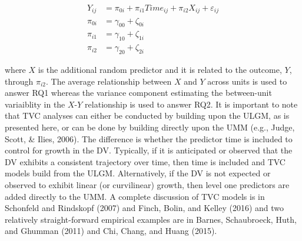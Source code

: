 \documentclass[english,,man]{apa6}
\theoremstyle{definition}
\theoremstyle{definition}
\theoremstyle{definition}
\theoremstyle{remark}
\begin{document}
\begin{align}
\label{ULGM}
Y_{ij} &= \pi_{0i} + \pi_{i1}Time_{ij} + \pi_{i2}X_{ij} + \varepsilon_{ij} \\
\pi_{0i} &= \gamma_{00} + \zeta_{0i} \\
\pi_{i1} &= \gamma_{10} + \zeta_{1i} \\
\pi_{i2} &= \gamma_{20} + \zeta_{2i}
\end{align}

\noindent \noindent where \(X\) is the additional random predictor and
it is related to the outcome, \(Y\), through \(\pi_{i2}\). The average
relationship between \(X\) and \(Y\) across units is used to answer RQ1
whereas the variance component estimating the between-unit variaiblity
in the \(X\)-\(Y\) relationship is used to answer RQ2. It is important
to note that TVC analyses can either be conducted by building upon the
ULGM, as is presented here, or can be done by building directly upon the
UMM (e.g., Judge, Scott, \& Ilies, 2006). The difference is whether the
predictor time is included to control for growth in the DV. Typically,
if it is anticipated or observed that the DV exhibits a consistent
trajectory over time, then time is included and TVC models build from
the ULGM. Alternatively, if the DV is not expected or observed to
exhibit linear (or curvilinear) growth, then level one predictors are
added directly to the UMM. A complete discussion of TVC models is in
Schonfeld and Rindskopf (2007) and Finch, Bolin, and Kelley (2016) and
two relatively straight-forward empirical examples are in Barnes,
Schaubroeck, Huth, and Ghumman (2011) and Chi, Chang, and Huang (2015).
\end{document}
